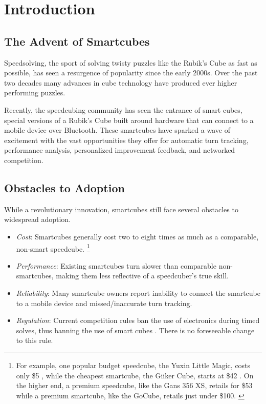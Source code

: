 \chapter{Introduction} 
\label{Chapter1}


\section{The Advent of Smartcubes}

Speedsolving, the sport of solving twisty puzzles like the Rubik's Cube
as fast as possible, has seen a resurgence of popularity since the
early 2000s. \cite{wca-competition-history} Over the past two decades
many advances in cube technology have produced ever higher performing
puzzles.

Recently, the speedcubing community has seen the entrance of smart
cubes, special versions of a Rubik's Cube built around hardware that
can connect to a mobile device over Bluetooth. These smartcubes have
sparked a wave of excitement with the vast opportunities they offer for
automatic turn tracking, performance analysis, personalized improvement
feedback, and networked competition.


\section{Obstacles to Adoption}

While a revolutionary innovation, smartcubes still face several obstacles to
widespread adoption.

\begin{itemize}

    \item \emph{Cost}: Smartcubes generally cost two to eight times as
    much as a comparable, non-smart speedcube. \footnote{For example,
    one popular budget speedcube, the Yuxin Little Magic, costs only
    \$5 \cite{yuxin-thecubicle}, while the cheapest smartcube, the
    Giiker Cube, starts at \$42 \cite{giiker-thecubicle}. On the higher
    end, a premium speedcube, like the Gans 356 XS, retails for \$53
    \cite{gans-xs-thecubicle} while a premium smartcube, like the
    GoCube, retails just under \$100. \cite{gocube-price}}
    
    \item \emph{Performance}: Existing smartcubes turn slower than
    comparable non-smartcubes, making them less reflective of a
    speedcuber's true skill. \cite{smartcube-regulation-discussion}
    
    \item \emph{Reliability}: Many smartcube owners report inability
    to connect the smartcube to a mobile device and missed/inaccurate
    turn tracking. \cite{smartcube-regulation-discussion}
    
    \item \emph{Regulation}: Current competition rules ban the use of
    electronics during timed solves, thus banning the use of smart
    cubes \cite{wca-regulations}. There is no foreseeable change to
    this rule. \cite{smartcube-regulation-discussion}
    
\end{itemize}

